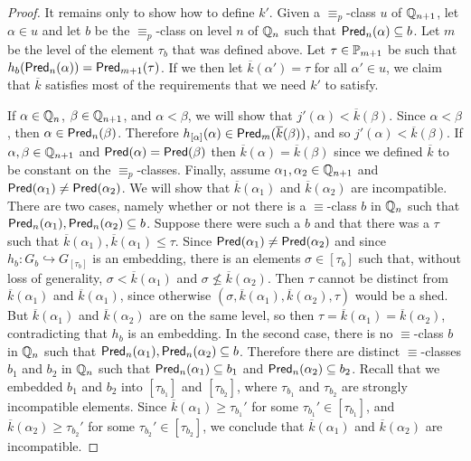 \begin{proof}
It remains only to show how to define $k'$.
Given a $\equiv_p$-class $u$ of $\mathbb{Q}_{n+1}$,
let $\alpha\in u$ and
let $b$ be the $\equiv_p$-class on level
$n$ of $\mathbb{Q}_n$ such that $\mathsf{Pred}_n(\alpha)\subseteq b$.
Let $m$ be the level of the element $\tau_b$
that was defined above.
Let $\tau\in\mathbb{P}_{m+1}$ be such that
$h_b(\mathsf{Pred}_n(\alpha))=\mathsf{Pred}_{m+1}(\tau)$.
If we then let $\overline{k}(\alpha')=\tau$
for all $\alpha'\in u$,
we claim that $\overline{k}$ satisfies most of
the requirements that we need $k'$ to satisfy.

If $\alpha\in\mathbb{Q}_n$, $\beta\in\mathbb{Q}_{n+1}$,
and $\alpha<\beta$, we will show that $j'(\alpha)<\overline{k}(\beta)$.
Since $\alpha<\beta$, then $\alpha\in\mathsf{Pred}_n(\beta)$.
Therefore $h_{[\alpha]}(\alpha)\in\mathsf{Pred}_{m}(\overline{k}(\beta))$,
and so $j'(\alpha)<\overline{k}(\beta)$.
If $\alpha,\beta\in\mathbb{Q}_{n+1}$ and $\mathsf{Pred}(\alpha)=\mathsf{Pred}(\beta)$ then
$\overline{k}(\alpha)=\overline{k}(\beta)$ since we defined $\overline{k}$ to be constant
on the $\equiv_p$-classes.
Finally, assume $\alpha_1,\alpha_2\in\mathbb{Q}_{n+1}$ and
$\mathsf{Pred}(\alpha_1)\neq \mathsf{Pred}(\alpha_2)$.
We will show that $\overline{k}(\alpha_1)$ and $\overline{k}(\alpha_2)$ are incompatible.
There are two cases, namely whether or not
there is a $\equiv$-class $b$ in $\mathbb{Q}_n$
such that $\mathsf{Pred}_n(\alpha_1),\mathsf{Pred}_n(\alpha_2)\subseteq b$.
Suppose there were such a $b$ and that there was a $\tau$ such that
$\overline{k}(\alpha_1),\overline{k}(\alpha_1)\leq\tau$.
Since $\mathsf{Pred}(\alpha_1)\neq \mathsf{Pred}(\alpha_2)$ and since
$h_b:G_b\hookrightarrow G_{[\tau_b]}$ is an embedding,
there is an elements $\sigma\in [\tau_b]$ such that,
without loss of generality, $\sigma<\overline{k}(\alpha_1)$
and $\sigma\not\leq \overline{k}(\alpha_2)$.
Then $\tau$ cannot be distinct from $\overline{k}(\alpha_1)$ and $\overline{k}(\alpha_1)$,
since otherwise $(\sigma,\overline{k}(\alpha_1),\overline{k}(\alpha_2),\tau)$ would be a shed.
But $\overline{k}(\alpha_1)$ and $\overline{k}(\alpha_2)$ are on the same level,
so then $\tau=\overline{k}(\alpha_1)=\overline{k}(\alpha_2)$,
contradicting that $h_b$ is an embedding.
In the second case, there is no
$\equiv$-class $b$ in $\mathbb{Q}_n$
such that $\mathsf{Pred}_n(\alpha_1),\mathsf{Pred}_n(\alpha_2)\subseteq b$.
Therefore there are distinct $\equiv$-classes $b_1$ and $b_2$ in $\mathbb{Q}_n$
such that $\mathsf{Pred}_n(\alpha_1)\subseteq b_1$ and $\mathsf{Pred}_n(\alpha_2)\subseteq b_2$.
Recall that we embedded $b_1$ and $b_2$ into
$[\tau_{b_1}]$ and $[\tau_{b_2}]$, where
$\tau_{b_1}$ and $\tau_{b_2}$ are strongly incompatible elements.
Since $\overline{k}(\alpha_1)\geq \tau_{b_1}'$ for some $\tau_{b_1}'\in[\tau_{b_1}]$,
and $\overline{k}(\alpha_2)\geq \tau_{b_2}'$ for some $\tau_{b_2}'\in[\tau_{b_2}]$,
we conclude that $\overline{k}(\alpha_1)$ and $\overline{k}(\alpha_2)$ are incompatible.


\end{proof}
